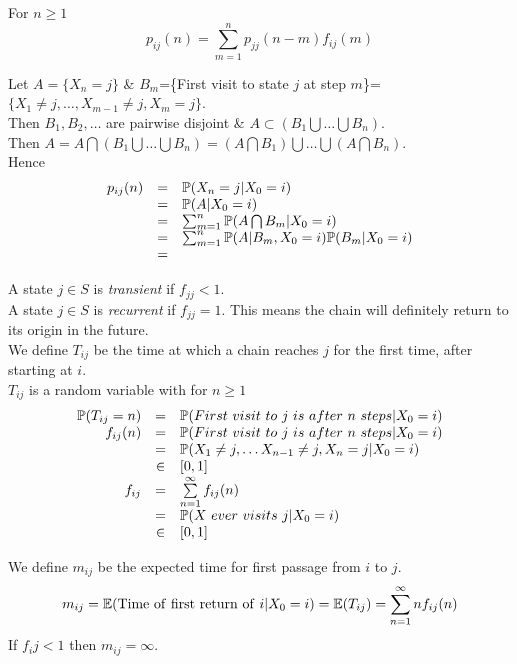 \documentclass[11pt,a4paper]{article}
\begin{document}
For $n\geq1$
$$p_{ij}(n)=\sum_{m=1}^np_{jj}(n-m)f_{ij}(m)$$

Let $A=\{X_n=j\}$ \& $B_m$=\{First visit to state $j$ at step $m$\}=$\{X_1\neq j,\dots,X_{m-1}\neq j,X_m=j\}$.\\
Then $B_1,B_2,\dots$ are pairwise disjoint \& $A\subset(B_1\bigcup\dots\bigcup B_n)$.\\
Then $A=A\bigcap(B_1\bigcup\dots\bigcup B_n)=(A\bigcap B_1)\bigcup\dots\bigcup(A\bigcap B_n)$.\\
Hence
\[\begin{array}{rcl}
p_{ij}(n)&=&\mathbb{P}(X_n=j|X_0=i)\\
&=&\mathbb{P}(A|X_0=i)\\
&=&\sum_{m=1}^n\mathbb{P}(A\bigcap B_m|X_0=i)\\
&=&\sum_{m=1}^n\mathbb{P}(A|B_m,X_0=i)\mathbb{P}(B_m|X_0=i)\\
&=&
\end{array}\]%


A state $j\in S$ is \textit{transient} if $f_{jj}<1$.\\
A state $j\in S$ is \textit{recurrent} if $f_{jj}=1$. This means the chain will definitely return to its origin in the future.\\

We define $T_{ij}$ be the time at which a chain reaches $j$ for the first time, after starting at $i$.\\
$T_{ij}$ is a random variable with for $n\geq1$
\[\begin{array}{rcl}
\prob(T_{ij}=n)&=&\prob(First\ visit\ to\ j\ is\ after\ n\ steps|X_0=i)\\
f_{ij}(n)&=&\prob(First\ visit\ to\ j\ is\ after\ n\ steps|X_0=i)\\
&=&\prob(X_1\neq j,\dots X_{n-1}\neq j, X_n=j|X_0=i)\\
&\in&[0,1]\\
f_{ij}&=&\sum\limits_{n=1}^\infty f_{ij}(n)\\
&=&\prob(X\ ever\ visits\ j|X_0=i)\\
&\in&[0,1]
\end{array}\]

We define $m_{ij}$ be the expected time for first passage from $i$ to $j$.
$$m_{ij}=\expect(\mathrm{Time\ of\ first\ return\ of\ }i|X_0=i)=\expect(T_{ij})=\sum_{n=1}^\infty nf_{ij}(n)$$
\nb If $f_ij<1$ then $m_{ij}=\infty$.\\
\end{document}
